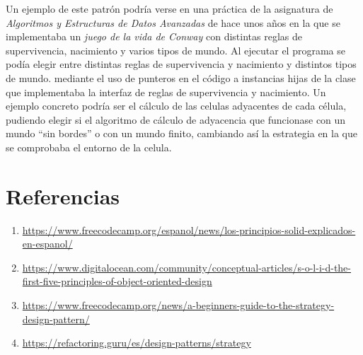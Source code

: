 \documentclass[11pt]{report}
\begin{document}
Un ejemplo de este patrón podría verse en una práctica de la asignatura de \textit{Algoritmos y 
Estructuras de Datos Avanzadas} de hace unos años en la que
se implementaba un \textit{juego de la vida de Conway} con distintas reglas de supervivencia, nacimiento y varios tipos de mundo. 
Al ejecutar el programa se podía elegir entre distintas reglas de supervivencia y nacimiento y distintos tipos de mundo.
mediante el uso de punteros en el código a instancias hijas de la clase que implementaba la interfaz de reglas de supervivencia y nacimiento. 
Un ejemplo concreto podría ser el cálculo de las celulas adyacentes de cada célula, pudiendo elegir si
el algoritmo de cálculo de adyacencia que funcionase con un mundo ``sin bordes'' o con un mundo finito, cambiando así
la estrategia en la que se comprobaba el entorno de la celula.

\cleardoublepage

\section*{Referencias}
\begin{enumerate}
      \item \url{https://www.freecodecamp.org/espanol/news/los-principios-solid-explicados-en-espanol/}
      \item \url{ https://www.digitalocean.com/community/conceptual-articles/s-o-l-i-d-the-first-five-principles-of-object-oriented-design}
      \item \url{https://www.freecodecamp.org/news/a-beginners-guide-to-the-strategy-design-pattern/}
      \item \url{https://refactoring.guru/es/design-patterns/strategy}
\end{enumerate}
\end{document}

